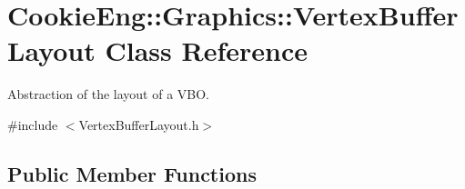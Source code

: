 \hypertarget{class_cookie_eng_1_1_graphics_1_1_vertex_buffer_layout}{}\section{Cookie\+Eng\+:\+:Graphics\+:\+:Vertex\+Buffer\+Layout Class Reference}
\label{class_cookie_eng_1_1_graphics_1_1_vertex_buffer_layout}


Abstraction of the layout of a V\+BO.  




{\ttfamily \#include $<$Vertex\+Buffer\+Layout.\+h$>$}

\subsection*{Public Member Functions}
